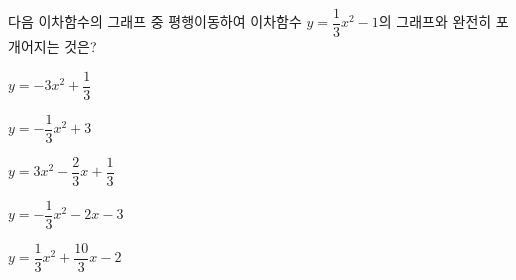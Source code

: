다음 이차함수의 그래프 중 평행이동하여 이차함수 $y=\dfrac{1}{3}x^2-1$의 그래프와 완전히 포개어지는 것은?
\begin{choicesii}{\rule[-3ex]{0pt}{8ex}$y=-3x^2+\dfrac{1}{3}$}{\rule[-3ex]{0pt}{8ex}$y=-\dfrac{1}{3}x^2+3$}{\rule[-3ex]{0pt}{8ex}$y=3x^2-\dfrac{2}{3}x+\dfrac{1}{3}$}{\rule[-3ex]{0pt}{8ex}$y=-\dfrac{1}{3}x^2-2x-3$}{\rule[-3ex]{0pt}{8ex}$y=\dfrac{1}{3}x^2+\dfrac{10}{3}x-2$}\end{choicesii}
